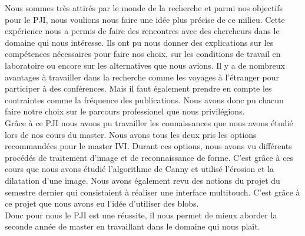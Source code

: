 Nous sommes très attirés par le monde de la recherche et parmi nos objectifs pour le PJI, nous voulions 
nous faire une idée plus précise de ce milieu. Cette expérience nous a permis de faire des rencontres
avec des chercheurs dans le domaine qui nous intéresse. Ils ont pu nous donner des explications
sur les compétences nécessaires pour faire nos choix, sur les conditions de travail en laboratoire 
ou encore sur les alternatives que nous avions. Il y a de nombreux avantages à travailler dans la recherche
comme les voyages à l'étranger pour participer à des conférences. Mais il faut également prendre en compte les contraintes
comme la fréquence des publications. Nous avons donc pu chacun faire notre choix sur le parcours professionel
que nous privilégions.\\

Grâce à ce PJI nous avons pu travailler les connaissances que nous avons étudié lors de nos cours du master.
Nous avons tous les deux pris les options recommandées pour le master IVI. Durant ces options, nous avons 
vu différents procédés de traitement d'image et de reconnaissance de forme. C'est grâce à ces cours que nous
avons étudié l'algorithme de Canny et utilisé l'érosion et la dilatation d'une image. Nous avons également
revu des notions du projet du semestre dernier qui consistaient à réaliser une interface multitouch. C'est grâce
à ce projet que nous avons eu l'idée d'utiliser des blobs.\\

Donc pour nous le PJI est une réussite, il nous permet de mieux aborder la seconde année de master en travaillant 
dans le domaine qui nous plaît.
\newpage